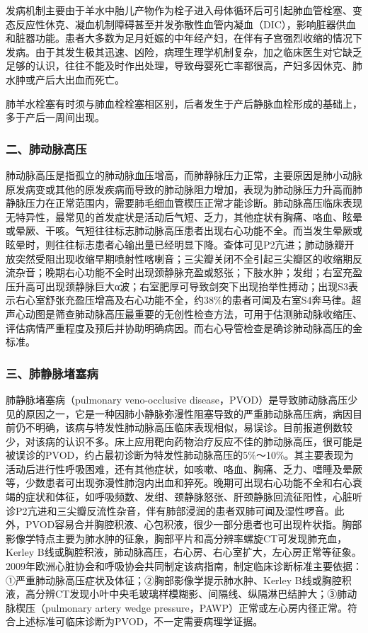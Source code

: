 发病机制主要由于羊水中胎儿产物作为栓子进入母体循环后可引起肺血管栓塞、变态反应性休克、凝血机制障碍甚至并发弥散性血管内凝血（DIC），影响脏器供血和脏器功能。患者大多数为足月妊娠的中年经产妇，在伴有子宫强烈收缩的情况下发病。由于其发生极其迅速、凶险，病理生理学机制复杂，加之临床医生对它缺乏足够的认识，往往不能及时作出处理，导致母婴死亡率都很高，产妇多因休克、肺水肿或产后大出血而死亡。

肺羊水栓塞有时须与肺血栓栓塞相区别，后者发生于产后静脉血栓形成的基础上，多于产后一周间出现。

\subsubsection{二、肺动脉高压}

肺动脉高压是指孤立的肺动脉血压增高，而肺静脉压力正常，主要原因是肺小动脉原发病变或其他的原发疾病而导致的肺动脉阻力增加，表现为肺动脉压力升高而肺静脉压力在正常范围内，需要肺毛细血管楔压正常才能诊断。肺动脉高压临床表现无特异性，最常见的首发症状是活动后气短、乏力，其他症状有胸痛、咯血、眩晕或晕厥、干咳。气短往往标志肺动脉高压患者出现右心功能不全。而当发生晕厥或眩晕时，则往往标志患者心输出量已经明显下降。查体可见P2亢进；肺动脉瓣开放突然受阻出现收缩早期喷射性喀喇音；三尖瓣关闭不全引起三尖瓣区的收缩期反流杂音；晚期右心功能不全时出现颈静脉充盈或怒张；下肢水肿；发绀；右室充盈压升高可出现颈静脉巨大α波；右室肥厚可导致剑突下出现抬举性搏动；出现S3表示右心室舒张充盈压增高及右心功能不全，约38\%的患者可闻及右室S4奔马律。超声心动图是筛查肺动脉高压最重要的无创性检查方法，可用于估测肺动脉收缩压、评估病情严重程度及预后并协助明确病因。而右心导管检查是确诊肺动脉高压的金标准。

\subsubsection{三、肺静脉堵塞病}

肺静脉堵塞病（pulmonary veno-occlusive
disease，PVOD）是导致肺动脉高压少见的原因之一，它是一种因肺小静脉弥漫性阻塞导致的严重肺动脉高压病，病因目前仍不明确，该病与特发性肺动脉高压临床表现相似，易误诊。目前报道例数较少，对该病的认识不多。床上应用靶向药物治疗反应不佳的肺动脉高压，很可能是被误诊的PVOD，约占最初诊断为特发性肺动脉高压的5\%～10\%。其主要表现为活动后进行性呼吸困难，还有其他症状，如咳嗽、咯血、胸痛、乏力、嗜睡及晕厥等，少数患者可出现弥漫性肺泡内出血和猝死。晚期可出现右心功能不全和右心衰竭的症状和体征，如呼吸频数、发绀、颈静脉怒张、肝颈静脉回流征阳性，心脏听诊P2亢进和三尖瓣反流性杂音，伴有肺部浸润的患者双肺可闻及湿性啰音。此外，PVOD容易合并胸腔积液、心包积液，很少一部分患者也可出现杵状指。胸部影像学特点主要为肺水肿的征象，胸部平片和高分辨率螺旋CT可发现肺充血，Kerley
B线或胸腔积液，肺动脉高压，右心房、右心室扩大，左心房正常等征象。2009年欧洲心脏协会和呼吸协会共同制定该病指南，制定临床诊断标准主要依据：①严重肺动脉高压症状及体征；②胸部影像学提示肺水肿、Kerley
B线或胸腔积液，高分辨CT发现小叶中央毛玻璃样模糊影、间隔线、纵隔淋巴结肿大；③肺动脉楔压（pulmonary
artery wedge
pressure，PAWP）正常或左心房内径正常。符合上述标准可临床诊断为PVOD，不一定需要病理学证据。

